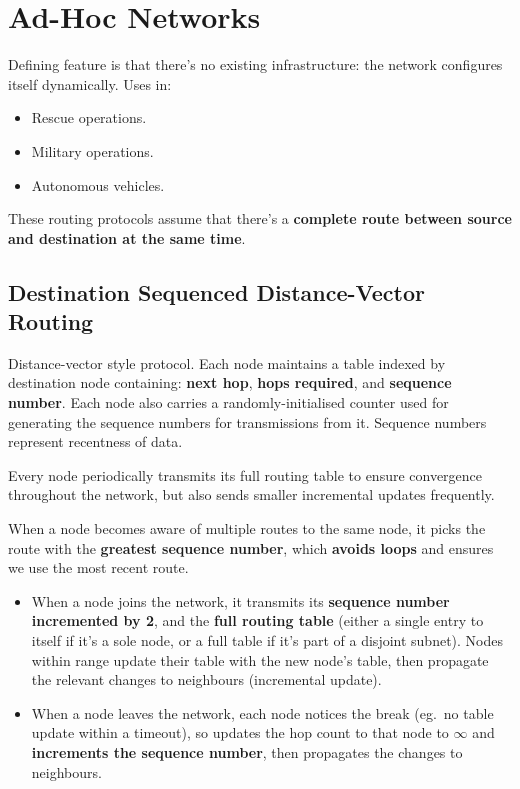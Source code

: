 \documentclass[a4paper, 11pt]{article}
\begin{document}
\section*{Ad-Hoc Networks}
{
    Defining feature is that there's no existing infrastructure: the network configures itself dynamically. Uses in:
    \begin{itemize}
    \item Rescue operations.
    \item Military operations.
    \item Autonomous vehicles.
    \end{itemize}

    These routing protocols assume that there's a \textbf{complete route between source and destination at the same time}.

    \subsection*{Destination Sequenced Distance-Vector Routing}
    {
        Distance-vector style protocol. Each node maintains a table indexed by destination node containing: \textbf{next hop}, \textbf{hops required}, and \textbf{sequence number}. Each node also carries a randomly-initialised counter used for generating the sequence numbers for transmissions from it. Sequence numbers represent recentness of data.

        Every node periodically transmits its full routing table to ensure convergence throughout the network, but also sends smaller incremental updates frequently.

        When a node becomes aware of multiple routes to the same node, it picks the route with the \textbf{greatest sequence number}, which \textbf{avoids loops} and ensures we use the most recent route.

        \begin{itemize}
        \item When a node joins the network, it transmits its \textbf{sequence number incremented by 2}, and the \textbf{full routing table} (either a single entry to itself if it's a sole node, or a full table if it's part of a disjoint subnet). Nodes within range update their table with the new node's table, then propagate the relevant changes to neighbours (incremental update).
        \item When a node leaves the network, each node notices the break (eg.\ no table update within a timeout), so updates the hop count to that node to \(\infty\) and \textbf{increments the sequence number}, then propagates the changes to neighbours.
        \end{itemize}

}}
\end{document}
